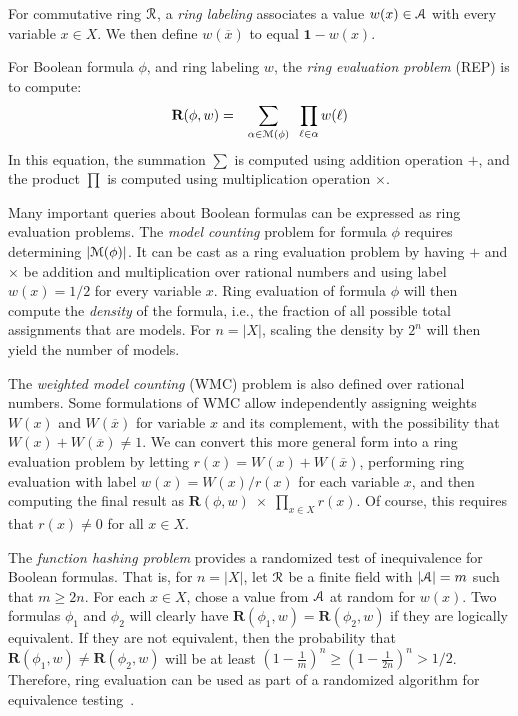 \documentclass[letterpaper,USenglish,cleveref, autoref, thm-restate]{lipics-v2021}
\newcommand{\obar}[1]{\overline{#1}}
\newcommand{\lit}{\ell}
\newcommand{\varset}{X}
\newcommand{\ring}{{\cal R}}
\newcommand{\dset}{{\cal A}}
\newcommand{\rep}{\textbf{R}}
\newcommand{\radd}{+}
\newcommand{\rmul}{\times}
\newcommand{\mulident}{\textbf{1}}
\newcommand{\modelset}{{\cal M}}
\begin{document}
\begin{definition}
  For commutative ring $\ring$, a {\em ring labeling} associates a value $w(x) \in \dset$ with
  every variable $x \in \varset$.  We then define $w(\obar{x})$ to equal $\mulident-w(x)$.

  For Boolean formula $\phi$, and ring labeling $w$, the {\em ring evaluation problem} (REP) is to compute:
  \begin{eqnarray}
    \rep(\phi, w) & = & \sum_{\alpha \in \modelset(\phi)} \;\; \prod_{\lit \in \alpha} w(\ell) \label{eqn:rep}
  \end{eqnarray}
  In this equation, the summation $\sum$ is computed using addition operation $\radd$, and the product $\prod$ is computed using multiplication operation $\rmul$.
\label{def:labeling}
\end{definition}

Many important queries about Boolean formulas can be
expressed as ring evaluation problems.  The
{\em model counting} problem for formula $\phi$ requires determining $|\modelset(\phi)|$.
It can be cast as a ring evaluation problem by having $\radd$ and
$\rmul$ be addition and multiplication over rational numbers and using
label $w(x) = 1/2$ for every variable $x$.
Ring evaluation of formula $\phi$ will then compute the {\em density} of
the formula, i.e., the fraction of all possible total assignments that are
models.  For $n = |\varset|$, scaling the density by $2^n$ will then
yield the number of models.

The {\em weighted model counting} (WMC) problem is also defined over
rational numbers.  Some formulations of WMC allow
independently assigning weights $W(x)$ and $W(\obar{x})$ for variable $x$ and its complement, with the possibility that
$W(x) + W(\obar{x}) \not = 1$.
We can convert this more general form into a
ring evaluation problem by letting $r(x) = W(x) + W(\obar{x})$,
performing ring evaluation with label $w(x) = W(x)/r(x)$ for each
variable $x$, and then computing the final result as $\rep(\phi, w)\;
\rmul\; \prod_{x \in \varset} r(x)$.  Of course, this requires that $r(x) \not = 0$ for all $x \in \varset$.

The {\em function hashing problem} provides a randomized test
of inequivalence for Boolean formulas.  That is, for $n = |\varset|$, let $\ring$ be a
finite  field with $|\dset| = m$ such that $m \geq 2 n$.  For each $x \in \varset$, chose a value from $\dset$ at random for $w(x)$.  Two formulas
$\phi_1$ and $\phi_2$ will clearly have $\rep(\phi_1, w) = \rep(\phi_2, w)$
if they are logically equivalent.  If they are not equivalent, then
the probability that $\rep(\phi_1, w) \not = \rep(\phi_2, w)$ will be at
least $\left(1-\frac{1}{m}\right)^n \geq \left(1-\frac{1}{2n}\right)^n > 1/2$.
Therefore, ring evaluation can be used as part of a
randomized algorithm for equivalence testing~\cite{blum:ipl:1980}.
\end{document}
